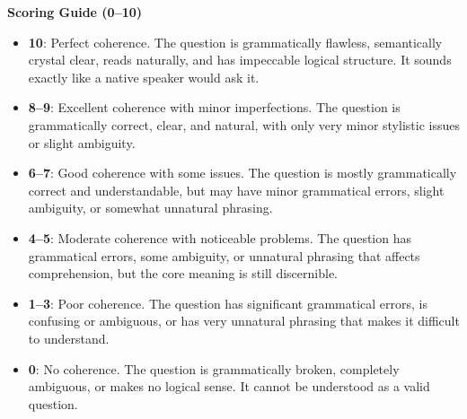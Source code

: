 \begin{tcolorbox}
\textbf{Scoring Guide (0--10)}
\begin{itemize}
  \item \textbf{10}: Perfect coherence. The question is grammatically flawless, semantically crystal clear, reads naturally, and has impeccable logical structure. It sounds exactly like a native speaker would ask it.
  \item \textbf{8--9}: Excellent coherence with minor imperfections. The question is grammatically correct, clear, and natural, with only very minor stylistic issues or slight ambiguity.
  \item \textbf{6--7}: Good coherence with some issues. The question is mostly grammatically correct and understandable, but may have minor grammatical errors, slight ambiguity, or somewhat unnatural phrasing.
  \item \textbf{4--5}: Moderate coherence with noticeable problems. The question has grammatical errors, some ambiguity, or unnatural phrasing that affects comprehension, but the core meaning is still discernible.
  \item \textbf{1--3}: Poor coherence. The question has significant grammatical errors, is confusing or ambiguous, or has very unnatural phrasing that makes it difficult to understand.
  \item \textbf{0}: No coherence. The question is grammatically broken, completely ambiguous, or makes no logical sense. It cannot be understood as a valid question.
\end{itemize}
\end{tcolorbox}


